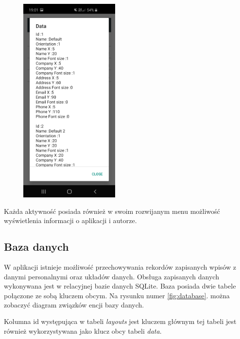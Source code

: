 \documentclass[a4paper,12pt, twoside]{article}
\begin{document}
\begin{enumerate}
\begin{figure}[H]
\begin{minipage}{.5\textwidth}
    	            \centering
    	            \includegraphics[width=5cm]{images/view_layoutDetails.jpg}
                    \label{fig:listDialog}
                \end{minipage}%
    	   \end{figure}
    	\end{enumerate}
    	
    	Każda aktywność posiada również w swoim rozwijanym menu możliwość wyświetlenia informacji o aplikacji i autorze.
 
        \subsection{Baza danych}
        W aplikacji istnieje możliwość przechowywania rekordów zapisanych wpisów z danymi personalnymi oraz układów danych. Obsługa zapisanych danych wykonywana jest w relacyjnej bazie danych SQLite. Baza posiada dwie tabele połączone ze sobą kluczem obcym. Na rysunku numer \ref{fig:database}. można zobaczyć diagram związków encji bazy danych. 
        
        Kolumna id występująca w tabeli \textit{layouts} jest kluczem głównym tej tabeli jest również wykorzystywana jako klucz obcy tabeli \textit{data}. 
        
\end{document}
